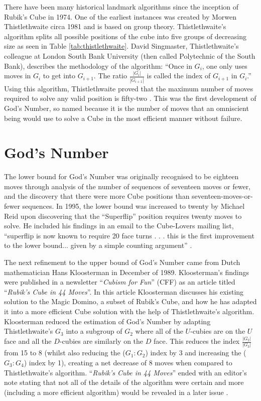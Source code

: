 \documentclass{report}
\newcommand{\propernoun}[1]{\enquote{\textit{#1}}}
\begin{document}
    There have been many historical landmark algorithms since the inception of Rubik's Cube in 1974. One of the earliest instances was created by Morwen Thistlethwaite circa 1981 and is based on group theory. Thistlethwaite's algorithm splits all possible positions of the cube into five groups of decreasing size as seen in Table \ref{tab:thistlethwaite}. David Singmaster, Thistlethwaite's colleague at London South Bank University (then called Polytechnic of the South Bank), describes the methodology of the algorithm: \enquote{Once in $G_i$, one only uses moves in $G_i$ to get into $G_{i+1}$. The ratio $\frac{|G_i|}{|G_{i+1}|}$ is called the index of $G_{i+1}$ in $G_i$.} Using this algorithm, Thistlethwaite proved that the maximum number of moves required to solve any valid position is fifty-two \cite{Singmaster1981}. This was the first development of God's Number, so named because it is the number of moves that an omniscient being would use to solve a Cube in the most efficient manner without failure.
    
    \section{God's Number}
    The lower bound for God's Number was originally recognised to be eighteen moves through analysis of the number of sequences of seventeen moves or fewer, and the discovery that there were more Cube positions than seventeen-moves-or-fewer sequences. In 1995, the lower bound was increased to twenty by Michael Reid upon discovering that the \enquote{Superflip} position requires twenty moves to solve. He included his findings in an email to the Cube-Lovers mailing list, \enquote{superflip is now known to require 20 face turns . . . this is the first improvement to the lower bound... given by a simple counting argument} \cite{Reid1995}.
    
    The next refinement to the upper bound of God's Number came from Dutch mathematician Hans Kloosterman in December of 1989. Kloosterman's findings were published in a newsletter \propernoun{Cubism for Fun} (CFF) as an article titled \propernoun{Rubik's Cube in 44 Moves}. In this article Kloosterman discusses his existing solution to the Magic Domino, a subset of Rubik's Cube, and how he has adapted it into a more efficient Cube solution with the help of Thistlethwaite's algorithm. Kloosterman reduced the estimation of God's Number by adapting Thistlethwaite's $G_3$ into a subgroup of $G_2$ where all of the $U$-cubies are on the $U$ face and all the $D$-cubies are similarly on the $D$ face. This reduces the index $\frac{|G_2|}{|G_3|}$ from 15 to 8 (whilst also reducing the ($G_1:G_2$) index by 3 and increasing the ($G_3:G_4$) index by 1), creating a net decrease of 8 moves when compared to Thistlethwaite's algorithm. \propernoun{Rubik's Cube in 44 Moves} ended with an editor's note stating that not all of the details of the algorithm were certain and more (including a more efficient algorithm) would be revealed in a later issue \cite{Kloosterman1989}.
    
\end{document}
